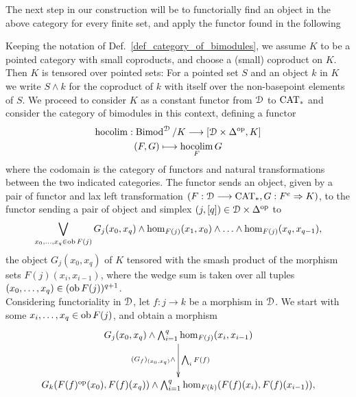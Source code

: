    The next step in our construction will be to functorially find an object in
    the above category for every finite set, and apply the functor found in the
    following
    \begin{defn}\label{def_hocolim}
      Keeping the notation of Def.~\ref{def_category_of_bimodules}, we assume
      $K$ to be a pointed category with small coproducts, and choose a (small)
      coproduct on $K$.  Then $K$ is tensored over pointed sets: For a pointed
      set $S$ and an object $k$ in $K$ we write $S \wedge k$ for the coproduct
      of $k$ with itself over the non-basepoint elements of $S$.
      We proceed to consider $K$ as a constant functor from $\mathcal{D}$ to $\mathrm{CAT}_*$
      and consider the category of bimodules in this context, defining a functor
      \begin{gather*}
        \hocolim: \operatorname{Bimod}^{\cD} / K \to %
          [\cD \times \Delta^{\mathrm{op}}, K]\\
        (F,G) \mapsto \hocolim_F G
      \end{gather*}
      where the codomain is the category of functors and natural transformations
      between the two indicated categories.
      The functor sends an object, given by a pair of functor and lax left
      transformation $(F: \mathcal{D} \longrightarrow \mathrm{CAT}_*, G: F^e \Rightarrow K)$, to the functor
      sending a pair of object and simplex $(j,[q]) \in \mathcal{D} \times
      \Delta^\mathrm{op}$ to
      \begin{displaymath}
        \bigvee_{x_0, \ldots, x_q \in \ob F(j)} %
          G_j(x_0,x_q) \wedge %
          \hom_{F(j)}(x_1,x_0) \wedge \ldots \wedge \hom_{F(j)}(x_q,x_{q-1}),
      \end{displaymath}
      the object $G_j(x_0,x_q)$ of $K$ tensored with the smash product of the
      morphism sets $F(j)(x_i,x_{i-1})$, where the wedge sum is taken over all
      tuples $(x_0, \ldots, x_q) \in (\operatorname{ob} F(j))^{q+1}$.\\
      Considering functoriality in $\mathcal{D}$, let $f \colon j \to k$ be a morphism in $\mathcal{D}$.
      We start with some $x_i, \ldots, x_q \in \operatorname{ob} F(j)$, and obtain a morphism
      \begin{displaymath}
        \xymatrix@R+1em{
          G_j(x_0,x_q) \wedge \bigwedge_{i=1}^q \hom_{F(j)}(x_i,x_{i-1}) %
            \ar[d]_{(G_f)_{(x_0,x_q)} \wedge}^{\bigwedge_i F(f)}
          \\
          G_k(F(f)^{\mathrm{op}}(x_0),F(f)(x_q)) \wedge %
            \bigwedge_{i=1}^q \hom_{F(k)}(F(f)(x_i),F(f)(x_{i-1})),  
        }

\end{displaymath}
\end{defn}
